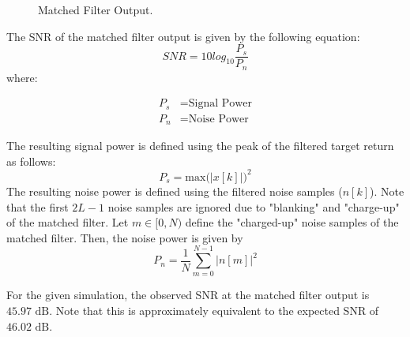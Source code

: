 \documentclass[conference]{IEEEtran}
\begin{document}
\begin{figure}[H]
\centerline{}
\caption{Matched Filter Output.}
\label{mf_output}
\end{figure}
\noindent
The SNR of the matched filter output is given by the following equation:
\begin{equation}
SNR = 10log_{10}\frac{P_s}{P_n}
\end{equation}
where:
\begin{fleqn}[\parindent]
\begin{align*}
P_s &= \text{Signal Power}\\
P_n &= \text{Noise Power}
\end{align*}
\end{fleqn}
The resulting signal power is defined using the peak of the filtered target return as follows:
\begin{equation}
P_s = \text{max(}|x[k]|\text{)}^2
\end{equation}
The resulting noise power is defined using the filtered noise samples ($n[k]$). Note that the first $2L-1$ noise samples are ignored due to "blanking" and "charge-up" of the matched filter. Let $m \in [0, N)$ define the "charged-up" noise samples of the matched filter. Then, the noise power is given by
\begin{equation}
P_n = \frac{1}{N}\sum_{m=0}^{N-1}|n[m]|^2
\end{equation}
\par
For the given simulation, the observed SNR at the matched filter output is $45.97 \text{ dB}$. Note that this is approximately equivalent to the expected SNR of $46.02 \text{ dB}$.
\end{document}
